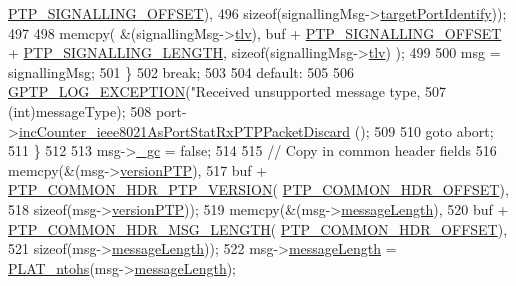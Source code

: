 \begin{DoxyCode}
{{{{{{{{      \hyperlink{avbts__message_8hpp_a3528ebe88df8c782038079cb1165d540}{PTP\_SIGNALLING\_OFFSET}),
496                    \textcolor{keyword}{sizeof}(signallingMsg->\hyperlink{class_p_t_p_message_signalling_a1d4353212906ed7366ffbf01cb56bdab}{targetPortIdentify}));
497 
498             memcpy( &(signallingMsg->\hyperlink{class_p_t_p_message_signalling_ab458dc952682abd8077ce12fbff3d1d6}{tlv}), buf + \hyperlink{avbts__message_8hpp_a3528ebe88df8c782038079cb1165d540}{PTP\_SIGNALLING\_OFFSET} + 
      \hyperlink{avbts__message_8hpp_ac728b0caa27d25b33564be179caa3ffd}{PTP\_SIGNALLING\_LENGTH}, \textcolor{keyword}{sizeof}(signallingMsg->\hyperlink{class_p_t_p_message_signalling_ab458dc952682abd8077ce12fbff3d1d6}{tlv}) );
499 
500             msg = signallingMsg;
501         \}
502         \textcolor{keywordflow}{break};
503 
504     \textcolor{keywordflow}{default}:
505 
506         \hyperlink{gptp__log_8hpp_a5c9d2f25d8d69eb2e585b35c72896357}{GPTP\_LOG\_EXCEPTION}(\textcolor{stringliteral}{"Received unsupported message type, %
507                     (\textcolor{keywordtype}{int})messageType);
508         port->\hyperlink{class_common_port_ab127287dc3c8d4bed5595b456ba4b17d}{incCounter\_ieee8021AsPortStatRxPTPPacketDiscard}
      ();
509 
510         \textcolor{keywordflow}{goto} abort;
511     \}
512 
513     msg->\hyperlink{class_p_t_p_message_common_a1b15d1687680708819ead19f82a970a9}{\_gc} = \textcolor{keyword}{false};
514 
515     \textcolor{comment}{// Copy in common header fields}
516     memcpy(&(msg->\hyperlink{class_p_t_p_message_common_aebd1e0693c6170ff1b08b2471db92a80}{versionPTP}),
517            buf + \hyperlink{avbts__message_8hpp_a4b78a578ef002737321ef5c6def6593e}{PTP\_COMMON\_HDR\_PTP\_VERSION}(
      \hyperlink{avbts__message_8hpp_a330dd502b6e19949d74c8f3a96dd5667}{PTP\_COMMON\_HDR\_OFFSET}),
518            \textcolor{keyword}{sizeof}(msg->\hyperlink{class_p_t_p_message_common_aebd1e0693c6170ff1b08b2471db92a80}{versionPTP}));
519     memcpy(&(msg->\hyperlink{class_p_t_p_message_common_a6c490faee54bca860c4d897aae50990f}{messageLength}),
520            buf + \hyperlink{avbts__message_8hpp_a6db27d50a88956a08a99f2eb7b020247}{PTP\_COMMON\_HDR\_MSG\_LENGTH}(
      \hyperlink{avbts__message_8hpp_a330dd502b6e19949d74c8f3a96dd5667}{PTP\_COMMON\_HDR\_OFFSET}),
521            \textcolor{keyword}{sizeof}(msg->\hyperlink{class_p_t_p_message_common_a6c490faee54bca860c4d897aae50990f}{messageLength}));
522     msg->\hyperlink{class_p_t_p_message_common_a6c490faee54bca860c4d897aae50990f}{messageLength} = \hyperlink{linux_2src_2platform_8cpp_a6b8f3e7b87b66fa774a07ddc67f883a7}{PLAT\_ntohs}(msg->\hyperlink{class_p_t_p_message_common_a6c490faee54bca860c4d897aae50990f}{messageLength});
}}}}}}}}}
\end{DoxyCode}
